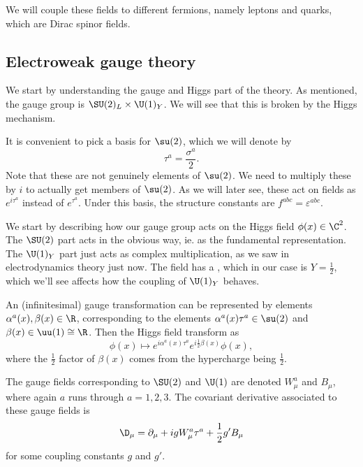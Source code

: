 \documentclass[a4paper]{article}
\begin{document}
We will couple these fields to different fermions, namely leptons and quarks, which are Dirac spinor fields.

\subsection{Electroweak gauge theory}
We start by understanding the gauge and Higgs part of the theory. As mentioned, the gauge group is $\SU(2)_L \times \U(1)_Y$. We will see that this is broken by the Higgs mechanism.

It is convenient to pick a basis for $\su(2)$, which we will denote by
\[
  \tau^a = \frac{\sigma^a}{2}.
\]
Note that these are not genuinely elements of $\su(2)$. We need to multiply these by $i$ to actually get members of $\su(2)$. As we will later see, these act on fields as $e^{i \tau^a}$ instead of $e^{\tau^a}$. Under this basis, the structure constants are $f^{abc} = \varepsilon^{abc}$.

We start by describing how our gauge group acts on the Higgs field $\phi(x) \in \C^2$. The $\SU(2)$ part acts in the obvious way, ie. as the fundamental representation. The $\U(1)_Y$ part just acts as complex multiplication, as we saw in electrodynamics theory just now. The field has a , which in our case is $Y = \frac{1}{2}$, which we'll see affects how the coupling of $\U(1)_Y$ behaves.

An (infinitesimal) gauge transformation can be represented by elements $\alpha^a(x), \beta(x) \in \R$, corresponding to the elements $\alpha^a(x) \tau^a \in \su(2)$ and $\beta(x) \in \uu (1) \cong \R$. Then the Higgs field transform as
\[
  \phi(x) \mapsto e^{i \alpha^a(x) \tau^a} e^{i \frac{1}{2} \beta(x)} \phi(x),
\]
where the $\frac{1}{2}$ factor of $\beta(x)$ comes from the hypercharge being $\frac{1}{2}$.

The gauge fields corresponding to $\SU(2)$ and $\U(1)$ are denoted $W_\mu^a$ and $B_\mu$, where again $a$ runs through $a = 1, 2, 3$. The covariant derivative associated to these gauge fields is
\[
  \D_\mu = \partial_\mu + i g W_\mu^a \tau^a + \frac{1}{2} g' B_\mu
\]
for some coupling constants $g$ and $g'$.
\end{document}
